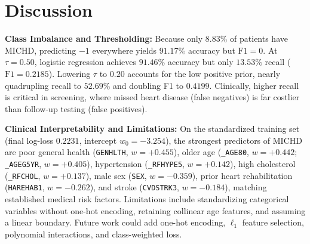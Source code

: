 \documentclass[10pt,conference,compsocconf]{IEEEtran}
\begin{document}
\begin{table}[htbp]
\centering
\caption{Ablation Study of Pipeline Modifications (5-Fold CV)}
\label{tab:ablation}
\end{table}

\section{Discussion}
\textbf{Class Imbalance and Thresholding:} Because only $8.83\%$ of patients have MICHD, predicting $-1$ everywhere yields $91.17\%$ accuracy but $\text{F1} = 0$. At $\tau = 0.50$, logistic regression achieves $91.46\%$ accuracy but only $13.53\%$ recall ($\text{F1} = 0.2185$). Lowering $\tau$ to $0.20$ accounts for the low positive prior, nearly quadrupling recall to $52.69\%$ and doubling F1 to $0.4199$. Clinically, higher recall is critical in screening, where missed heart disease (false negatives) is far costlier than follow-up testing (false positives).

\textbf{Clinical Interpretability and Limitations:} On the standardized training set (final log-loss $0.2231$, intercept $w_0 = -3.254$), the strongest predictors of MICHD are poor general health (\texttt{GENHLTH}, $w = +0.455$), older age (\texttt{\_AGE80}, $w = +0.442$; \texttt{\_AGEG5YR}, $w = +0.405$), hypertension (\texttt{\_RFHYPE5}, $w = +0.142$), high cholesterol (\texttt{\_RFCHOL}, $w = +0.137$), male sex (\texttt{SEX}, $w = -0.359$), prior heart rehabilitation (\texttt{HAREHAB1}, $w = -0.262$), and stroke (\texttt{CVDSTRK3}, $w = -0.184$), matching established medical risk factors. Limitations include standardizing categorical variables without one-hot encoding, retaining collinear age features, and assuming a linear boundary. Future work could add one-hot encoding, $\ell_1$ feature selection, polynomial interactions, and class-weighted loss.
\end{document}
